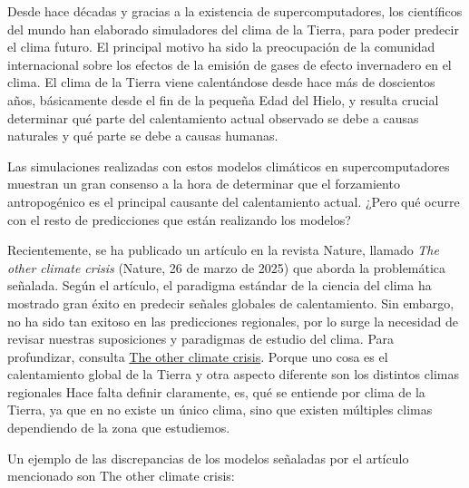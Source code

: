 \documentclass[
  10pt,
  a4paper,
  DIV=11,
  numbers=noendperiod,
  open=any]{scrreprt}
\numberwithin{equation}{chapter}
\numberwithin{equation}{section}
\renewcommand{\[}{\begin{equation}}
\renewcommand{\]}{\end{equation}}
\begin{document}
Desde hace décadas y gracias a la existencia de supercomputadores, los
científicos del mundo han elaborado simuladores del clima de la Tierra,
para poder predecir el clima futuro. El principal motivo ha sido la
preocupación de la comunidad internacional sobre los efectos de la
emisión de gases de efecto invernadero en el clima. El clima de la
Tierra viene calentándose desde hace más de doscientos años, básicamente
desde el fin de la pequeña Edad del Hielo, y resulta crucial determinar
qué parte del calentamiento actual observado se debe a causas naturales
y qué parte se debe a causas humanas.

Las simulaciones realizadas con estos modelos climáticos en
supercomputadores muestran un gran consenso a la hora de determinar que
el forzamiento antropogénico es el principal causante del calentamiento
actual. ¿Pero qué ocurre con el resto de predicciones que están
realizando los modelos?

Recientemente, se ha publicado un artículo en la revista Nature, llamado
\emph{The other climate crisis} (Nature, 26 de marzo de 2025) que aborda
la problemática señalada. Según el artículo, el paradigma estándar de la
ciencia del clima ha mostrado gran éxito en predecir señales globales de
calentamiento. Sin embargo, no ha sido tan exitoso en las predicciones
regionales, por lo surge la necesidad de revisar nuestras suposiciones y
paradigmas de estudio del clima. Para profundizar, consulta
\href{https://www.nature.com/articles/s41586-025-08680-1}{The other
climate crisis}. Porque uno cosa es el calentamiento global de la Tierra
y otra aspecto diferente son los distintos climas regionales Hace falta
definir claramente, es, qué se entiende por clima de la Tierra, ya que
en no existe un único clima, sino que existen múltiples climas
dependiendo de la zona que estudiemos.

Un ejemplo de las discrepancias de los modelos señaladas por el artículo
mencionado son The other climate crisis:
\end{document}
